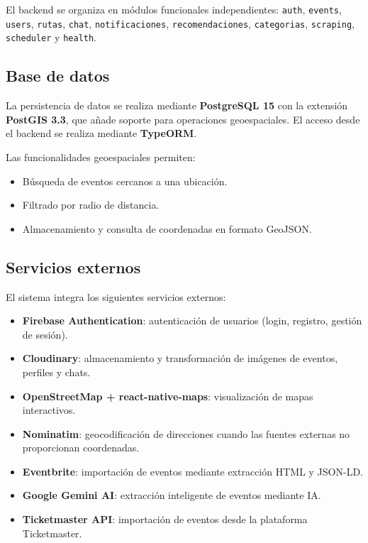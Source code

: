 El backend se organiza en módulos funcionales independientes: \texttt{auth}, \texttt{events}, \texttt{users}, \texttt{rutas}, \texttt{chat}, \texttt{notificaciones}, \texttt{recomendaciones}, \texttt{categorias}, \texttt{scraping}, \texttt{scheduler} y \texttt{health}.

\subsection{Base de datos}

La persistencia de datos se realiza mediante \textbf{PostgreSQL 15} con la extensión \textbf{PostGIS 3.3}, que añade soporte para operaciones geoespaciales. El acceso desde el backend se realiza mediante \textbf{TypeORM}.

Las funcionalidades geoespaciales permiten:
\begin{itemize}
    \item Búsqueda de eventos cercanos a una ubicación.
    \item Filtrado por radio de distancia.
    \item Almacenamiento y consulta de coordenadas en formato GeoJSON.
\end{itemize}

\subsection{Servicios externos}

El sistema integra los siguientes servicios externos:

\begin{itemize}
    \item \textbf{Firebase Authentication}: autenticación de usuarios (login, registro, gestión de sesión).
    \item \textbf{Cloudinary}: almacenamiento y transformación de imágenes de eventos, perfiles y chats.
    \item \textbf{OpenStreetMap + react-native-maps}: visualización de mapas interactivos.
    \item \textbf{Nominatim}: geocodificación de direcciones cuando las fuentes externas no proporcionan coordenadas.
    \item \textbf{Eventbrite}: importación de eventos mediante extracción HTML y JSON-LD.
    \item \textbf{Google Gemini AI}: extracción inteligente de eventos mediante IA.
    \item \textbf{Ticketmaster API}: importación de eventos desde la plataforma Ticketmaster.
\end{itemize}

